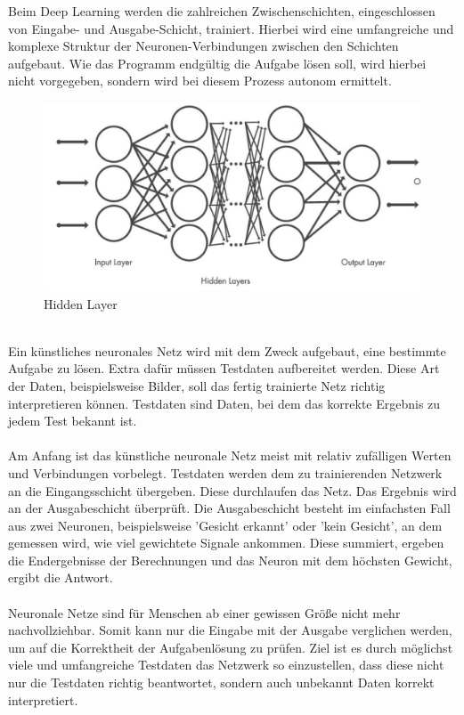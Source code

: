 \documentclass[12pt,oneside,a4paper,parskip]{scrbook}
\begin{document}
Beim Deep Learning werden die zahlreichen Zwischenschichten, eingeschlossen von Eingabe- und Ausgabe-Schicht, trainiert. Hierbei wird eine umfangreiche und komplexe Struktur der Neuronen-Verbindungen zwischen den Schichten aufgebaut. Wie das Programm endgültig die Aufgabe lösen soll, wird hierbei nicht vorgegeben, sondern wird bei diesem Prozess autonom ermittelt.
\begin{figure}[h]
	\begin{center}
		\includegraphics[width=15cm]{Bilder/Deep-Learning.jpg}
		\caption{Hidden Layer}
		\label{Deep Learing von Technik-und-Wissen}
	\end{center}
\end{figure}
\\Ein künstliches neuronales Netz wird mit dem Zweck aufgebaut, eine bestimmte Aufgabe zu lösen. Extra dafür müssen Testdaten aufbereitet werden. Diese Art der Daten, beispielsweise Bilder, soll das fertig trainierte Netz richtig interpretieren können. Testdaten sind Daten, bei dem das korrekte Ergebnis zu jedem Test bekannt ist.
\\\\
Am Anfang ist das künstliche neuronale Netz meist mit relativ zufälligen Werten und Verbindungen vorbelegt. Testdaten werden dem zu trainierenden Netzwerk an die Eingangsschicht übergeben. Diese durchlaufen das Netz. Das Ergebnis wird an der Ausgabeschicht überprüft. Die Ausgabeschicht besteht im einfachsten Fall aus zwei Neuronen, beispielsweise 'Gesicht erkannt' oder 'kein Gesicht', an dem gemessen wird, wie viel gewichtete Signale ankommen. Diese summiert, ergeben die Endergebnisse der Berechnungen und das Neuron mit dem höchsten Gewicht, ergibt die Antwort.
\\\\
Neuronale Netze sind für Menschen ab einer gewissen Größe nicht mehr nachvollziehbar. Somit kann nur die Eingabe mit der Ausgabe verglichen werden, um auf die Korrektheit der Aufgabenlösung zu prüfen. Ziel ist es durch möglichst viele und umfangreiche Testdaten das Netzwerk so einzustellen, dass diese nicht nur die Testdaten richtig beantwortet, sondern auch unbekannt Daten korrekt interpretiert.
\end{document}
